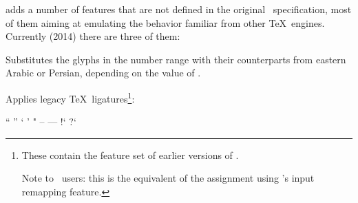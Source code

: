   \enddescriptions

\endsubsection

 adds a number of features that are not defined
in the original \OpenType\ specification, most of them
aiming at emulating the behavior familiar from other \TeX\ engines.
%
Currently (2014) there are three of them:

\begindescriptions

          Substitutes the glyphs in the  number range
          with their counterparts from eastern Arabic or Persian,
          depending on the value of .
  \endaltitem

          Applies legacy \TeX\ ligatures\footnote{%
            These contain the feature set  of earlier
            versions of .

            Note to \XeTeX\ users: this is the equivalent of the
            assignment  using \XeTeX's input
            remapping feature.
          }:

          \unless \iffalse
            \begintabulate [rlrl]
              \beginrow ``  \newcell  {\inlinecode !``! } \newcell  ''  \newcell  {\inlinecode !''!} \endrow
              \beginrow `   \newcell  {\inlinecode !`!  } \newcell  '   \newcell  {\inlinecode !'! } \endrow
              \beginrow "   \newcell  {\inlinecode !"!  } \newcell  --  \newcell  {\inlinecode !--!} \endrow
              \beginrow --- \newcell  {\inlinecode !---!} \newcell  !`  \newcell  {\inlinecode ?!`?} \endrow
              \beginrow ?`  \newcell  {\inlinecode !?`! } \newcell      \newcell                     \endrow
            \endtabulate
          \else
            \startframed [frame=off,width=broad,align=middle]
              \startframed [frame=off,width=\dimexpr(\textwidth/2)]
                \startxtable [align=middle]
                    \startxrow \startxcell ``  \stopxcell \startxcell  {}  \stopxcell \startxcell  ''  \stopxcell \startxcell  {}  \stopxcell \stopxrow
                    \startxrow \startxcell `   \stopxcell \startxcell  {}   \stopxcell \startxcell  '   \stopxcell \startxcell  {}   \stopxcell \stopxrow
                    \startxrow \startxcell "   \stopxcell \startxcell  {}   \stopxcell \startxcell  --  \stopxcell \startxcell  \inlinecode {--}  \stopxcell \stopxrow
                    \startxrow \startxcell --- \stopxcell \startxcell  \inlinecode {---} \stopxcell \startxcell  !`  \stopxcell \startxcell  {}  \stopxcell \stopxrow
                    \startxrow \startxcell ?`  \stopxcell \startxcell  {}  \stopxcell \startxcell      \stopxcell \startxcell                    \stopxcell \stopxrow
                \stopxtable
              \stopframed
            \stopframed
          \fi
  \endaltitem


